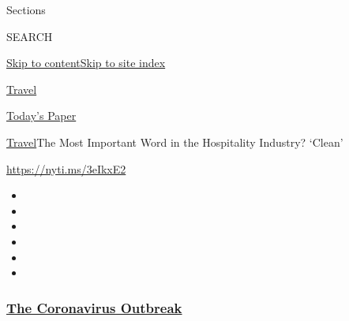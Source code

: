 Sections

SEARCH

\protect\hyperlink{site-content}{Skip to
content}\protect\hyperlink{site-index}{Skip to site index}

\href{https://www.nytimes3xbfgragh.onion/section/travel}{Travel}

\href{https://myaccount.nytimes3xbfgragh.onion/auth/login?response_type=cookie\&client_id=vi}{}

\href{https://www.nytimes3xbfgragh.onion/section/todayspaper}{Today's
Paper}

\href{/section/travel}{Travel}\textbar{}The Most Important Word in the
Hospitality Industry? `Clean'

\url{https://nyti.ms/3eIkxE2}

\begin{itemize}
\item
\item
\item
\item
\item
\item
\end{itemize}

\hypertarget{the-coronavirus-outbreak}{%
\subsubsection{\texorpdfstring{\href{https://www.nytimes3xbfgragh.onion/news-event/coronavirus?name=styln-coronavirus-national\&region=TOP_BANNER\&block=storyline_menu_recirc\&action=click\&pgtype=Article\&impression_id=b0026620-f1c5-11ea-afae-53b463e59741\&variant=undefined}{The
Coronavirus
Outbreak}}{The Coronavirus Outbreak}}\label{the-coronavirus-outbreak}}

